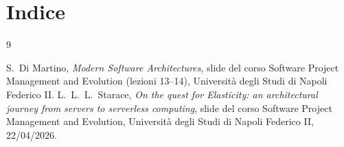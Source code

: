 \documentclass[11pt, a4paper, oneside, openany]{report}
\makeatletter
\renewcommand\tableofcontents{\section*{Indice}\@starttoc{toc}}
\makeatother
\begin{document}


\tableofcontents









\clearpage

{\renewcommand{\chapter}{\section}\renewcommand{\bibname}{Riferimenti}
\begin{thebibliography}{9}
 S.~Di Martino, \emph{Modern Software Architectures}, slide del corso Software Project Management and Evolution (lezioni 13--14), Università degli Studi di Napoli Federico II.
 L.~L.~L.~Starace, \emph{On the quest for Elasticity: an architectural journey from servers to serverless computing}, slide del corso Software Project Management and Evolution, Università degli Studi di Napoli Federico II, 22/04/2026.
\end{thebibliography}}
\end{document}
